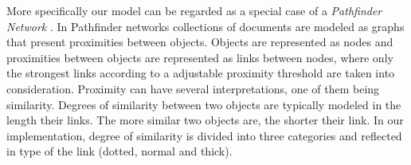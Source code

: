 More specifically our model can be regarded as a special case of a \emph{Pathfinder Network} \cite{schvaneveldt1990pathfinder}.
In Pathfinder networks collections of documents are modeled as graphs that present proximities between objects. 
Objects are represented as nodes and proximities between objects are represented as links between nodes, where only the strongest links according to a adjustable proximity threshold are taken into consideration. Proximity can have several interpretations, one of them being similarity.
Degrees of similarity between two objects are typically modeled in the length their links. The more similar two objects are, the shorter their link.
In our implementation, degree of similarity is divided into three categories and reflected in type of the link (dotted, normal and thick). 










